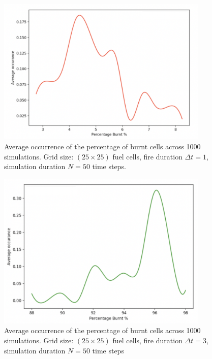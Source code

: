 \begin{figure}[H]
\begin{center}
\includegraphics[width=0.9\textwidth]{Figures/ffff1.png}
\caption{Average occurrence of the percentage of burnt cells across 1000 simulations. Grid size: $(25\times 25)$ fuel cells, fire duration $\Delta t=1$, simulation duration $N=50$ time steps.} 
\label{f42}
\end{center}
\end{figure}

\begin{figure}[H]
\begin{center}
\includegraphics[width=0.9\textwidth]{Figures/ffff2.png}
\caption{Average occurrence of the percentage of burnt cells across 1000 simulations. Grid size: $(25\times 25)$ fuel cells, fire duration $\Delta t=3$, simulation duration $N=50$ time steps} 
\label{f43}
\end{center}
\end{figure}


